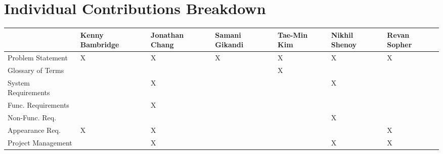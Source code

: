 \documentclass[letterpaper,english]{scrreprt}
\begin{document}
\chapter*{Individual Contributions Breakdown}
\begin{center}
	\begin{tabular}{|l|C{2cm}|C{1.5cm}|C{1.5cm}|C{1.5cm}|C{1.5cm}|C{1.5cm}|}
		\hline
								&Kenny Bambridge&Jonathan Chang	&Samani Gikandi	&Tae-Min Kim&Nikhil Shenoy	&Revan Sopher\\ \hline
			Problem Statement	&		X		&		X		&		X		&		X	&		X		&		X\\ \hline
			Glossary of Terms	&				&				&				&		X	&				&		\\ \hline
			System Requirements	&				&		X		&				&			&		X		&		\\ \hline
			Func. Requirements	&				&		X		&				&			&				&		\\ \hline
			Non-Func. Req.		&				&				&				&			&		X		&		\\ \hline
			Appearance Req.		&		X		&		X		&				&			&				&		X\\ \hline
			Project Management	&				&		X		&				&			&		X		&		X\\ \hline
	\end{tabular}
\end{center}
\end{document}
